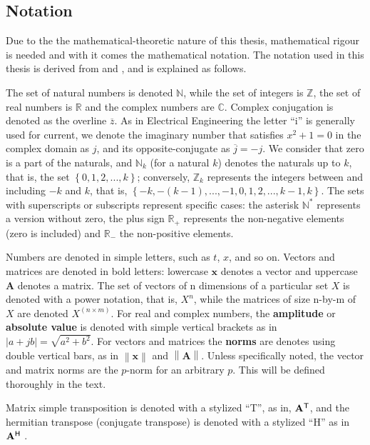 \subsection{Notation} %

	Due to the the mathematical-theoretic nature of this thesis, mathematical rigour is needed and with it comes the mathematical notation. The notation used in this thesis is derived from \cite{lamportTLA2002} and \cite{Perko2001}, and is explained as follows.

	The set of natural numbers is denoted $\mathbb{N}$, while the set of integers is $\mathbb{Z}$, the set of real numbers is $\mathbb{R}$ and the complex numbers are $\mathbb{C}$. Complex conjugation is denoted as the overline $\overline{z}$. As in Electrical Engineering the letter ``i'' is generally used for current, we denote the imaginary number that satisfies $x^2 + 1 = 0$ in the complex domain as $j$, and its opposite-conjugate as $\overline{j} = -j$. We consider that zero is a part of the naturals, and $\mathbb{N}_k$ (for a natural $k$) denotes the naturals up to $k$, that is, the set $\left\{0,1,2,...,k\right\}$; conversely, $\mathbb{Z}_k$ represents the integers between and including $-k$ and $k$, that is, $\left\{-k,-(k-1),...,-1,0,1,2,...,k-1,k\right\}$. The sets with superscripts or subscripts represent specific cases: the asterisk $\mathbb{N}^*$ represents a version without zero, the plus sign $\mathbb{R}_+$ represents the non-negative elements (zero is included) and $\mathbb{R}_-$ the non-positive elements.

	Numbers are denoted in simple letters, such as $t$, $x$, and so on. Vectors and matrices are denoted in bold letters: lowercase $\mathbf{x}$ denotes a vector and uppercase $\mathbf{A}$ denotes a matrix. The set of vectors of n dimensions of a particular set $X$ is denoted with a power notation, that is, $X^n$, while the matrices of size n-by-m of $X$ are denoted $X^{(n\times m)}$.  For real and complex numbers, the \textbf{amplitude} or \textbf{absolute value} is denoted with simple vertical brackets as in $\left\lvert a + jb \right\rvert = \sqrt{a^2 + b^2}$. For vectors and matrices the \textbf{norms} are denotes using double vertical bars, as in $\left\lVert \mathbf{x}\right\rVert$ and $\left\lVert \mathbf{A}\right\rVert$. Unless specifically noted, the vector and matrix norms are the $p$-norm for an arbitrary $p$. This will be defined thoroughly in the text.

	Matrix simple transposition is denoted with a stylized ``T'', as in, $\mathbf{A}^{\mathsf{T}}$, and the hermitian transpose (conjugate transpose) is denoted with a stylized ``H'' as in $\mathbf{A}^{\mathsf{H}}$
.

